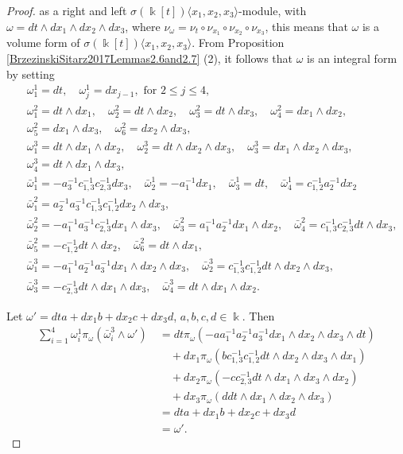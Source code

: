 \documentclass{amsart}
\theoremstyle{definition}
\theoremstyle{remark}
\numberwithin{equation}{section}
\begin{document}
\begin{proof}
as a right and left $\sigma(\Bbbk[t])\langle x_1, x_2, x_3\rangle$-module, with $\omega=dt\wedge dx_1 \wedge dx_2 \wedge dx_3$, where $\nu_{\omega}=\nu_t\circ\nu_{x_1}\circ\nu_{x_2}\circ\nu_{x_3}$, this means that $\omega$ is a volume form of $\sigma(\Bbbk[t])\langle x_1, x_2, x_3\rangle$. From Proposition \ref{BrzezinskiSitarz2017Lemmas2.6and2.7} (2), it follows that $\omega$ is an integral form by setting
\begin{align*}
    &\ \omega_1^1= dt, \quad \omega_j^1= dx_{j-1}, \text{ for } 2\leq j \leq 4, \\
    &\ \omega_1^2=dt\wedge dx_1, \quad \omega_2^2=dt\wedge dx_2, \quad \omega_3^2= dt\wedge dx_3, \quad \omega_4^2= dx_1\wedge dx_2, \\
    &\ \omega_5^2= dx_1\wedge dx_3, \quad  \omega_6^2= dx_2\wedge dx_3,   \\
    &\ \omega_1^3=dt\wedge dx_1\wedge dx_2, \quad \omega_2^3= dt\wedge dx_2 \wedge dx_3, \quad \omega_3^3= dx_1\wedge dx_2 \wedge dx_3, \\
    &\ \omega_4^3= dt\wedge dx_1 \wedge dx_3, \\
     &\ \bar{\omega}_1^1=-a_3^{-1}c_{1,3}^{-1}c_{2,3}^{-1}dx_3, \quad \bar{\omega}_2^1=-a_1^{-1}dx_1,\quad \bar{\omega}_3^1=dt, \quad \bar{\omega}_4^1=c_{1,2}^{-1}a_2^{-1}dx_2 \\
    &\ \bar{\omega}_1^2=a_2^{-1}a_{3}^{-1}c_{1,3}^{-1}c_{1,2}^{-1}dx_2\wedge dx_3, \\
    &\ \bar{\omega}_2^2=-a_1^{-1}a_3^{-1}c_{2,3}^{-1}dx_1\wedge dx_3, \quad \bar{\omega}_3^2 = a_1^{-1}a_2^{-1}dx_1\wedge dx_2, \quad \bar{\omega}_4^2 = c_{1,3}^{-1}c_{2,3}^{-1}dt\wedge dx_3, \\
    &\ \bar{\omega}_5^2 = -c_{1,2}^{-1}dt\wedge dx_2, \quad \bar{\omega}_6^2 = dt\wedge dx_1,\\
    &\ \bar{\omega}_1^3=-a_1^{-1}a_2^{-1}a_3^{-1}dx_1\wedge dx_2\wedge dx_3, \quad \bar{\omega}_2^3=c_{1,3}^{-1}c_{1,2}^{-1}dt\wedge dx_2 \wedge dx_3, \\
    &\ \bar{\omega}_3^3=-c_{2,3}^{-1}dt\wedge dx_1\wedge dx_3, \quad \bar{\omega}_4^3=dt \wedge dx_1 \wedge dx_2. 
\end{align*}

Let $\omega' = dta+dx_1b+dx_2c+dx_3d$, $a,b,c,d \in \Bbbk$. Then
\begin{align*}
\sum_{i=1}^{4}\omega_{i}^{1}\pi_{\omega}(\bar{\omega}_i^{3}\wedge \omega') &\ =dt\pi_{\omega}(-aa_1^{-1}a_2^{-1}a_3^{-1}dx_1\wedge dx_2\wedge dx_3 \wedge dt)\\
    &\ \quad + dx_1\pi_{\omega}(bc_{1,3}^{-1}c_{1,2}^{-1}dt\wedge dx_2\wedge dx_3\wedge dx_1 ) \\
    &\ \quad + dx_2\pi_{\omega}(-cc_{2,3}^{-1}dt\wedge dx_1\wedge dx_3 \wedge dx_2)\\
    &\ \quad + dx_3\pi_{\omega}(ddt\wedge dx_1\wedge dx_2 \wedge dx_3)\\
    &\ = dta + dx_1b + dx_2c + dx_3d \\
    &\ = \omega'.
\end{align*}


\end{proof}
\end{document}
